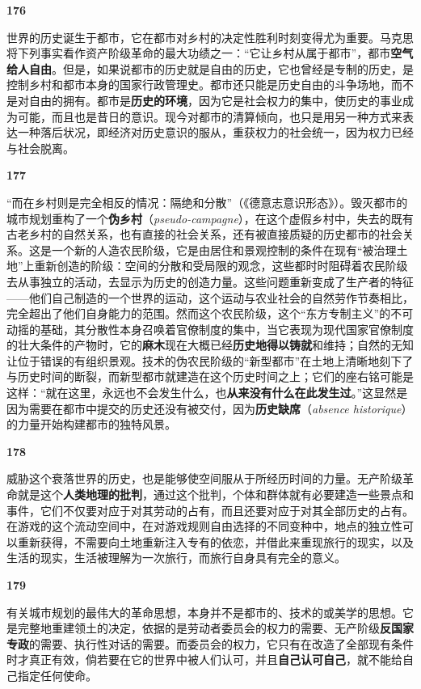 \documentclass[fontset=fandol, a4paper, 12pt, openright]{ctexbook}
\makeatletter
\newcommand{\thesis}[1]{%
    \par\vspace{1.5em}%
    {\centering \textbf{\Large #1}\par}%
    \nobreak\vspace{0.5em}\nobreak
    \@afterindenttrue %
    \@afterheading    %
}
\makeatother
\begin{document}
\thesis{176}
世界的历史诞生于都市，它在都市对乡村的决定性胜利时刻变得尤为重要。马克思将下列事实看作资产阶级革命的最大功绩之一：“它让乡村从属于都市”，都市\textbf{空气给人自由}。但是，如果说都市的历史就是自由的历史，它也曾经是专制的历史，是控制乡村和都市本身的国家行政管理史。都市还只能是历史自由的斗争场地，而不是对自由的拥有。都市是\textbf{历史的环境}，因为它是社会权力的集中，使历史的事业成为可能，而且也是昔日的意识。现今对都市的清算倾向，也只是用另一种方式来表达一种落后状况，即经济对历史意识的服从，重获权力的社会统一，因为权力已经与社会脱离。

\thesis{177}
“而在乡村则是完全相反的情况：隔绝和分散”（《德意志意识形态》）。毁灭都市的城市规划重构了一个\textbf{伪乡村}（\textit{pseudo-campagne}），在这个虚假乡村中，失去的既有古老乡村的自然关系，也有直接的社会关系，还有被直接质疑的历史都市的社会关系。这是一个新的人造农民阶级，它是由居住和景观控制的条件在现有“被治理土地”上重新创造的阶级：空间的分散和受局限的观念，这些都时时阻碍着农民阶级去从事独立的活动，去显示为历史的创造力量。这些问题重新变成了生产者的特征——他们自己制造的一个世界的运动，这个运动与农业社会的自然劳作节奏相比，完全超出了他们自身能力的范围。然而这个农民阶级，这个“东方专制主义”的不可动摇的基础，其分散性本身召唤着官僚制度的集中，当它表现为现代国家官僚制度的壮大条件的产物时，它的\textbf{麻木}现在大概已经\textbf{历史地得以铸就}和维持；自然的无知让位于错误的有组织景观。技术的伪农民阶级的“新型都市”在土地上清晰地刻下了与历史时间的断裂，而新型都市就建造在这个历史时间之上；它们的座右铭可能是这样：“就在这里，永远也不会发生什么，也\textbf{从来没有什么在此发生过}。”这显然是因为需要在都市中提交的历史还没有被交付，因为\textbf{历史缺席}（\textit{absence historique}）的力量开始构建都市的独特风景。

\thesis{178}
威胁这个衰落世界的历史，也是能够使空间服从于所经历时间的力量。无产阶级革命就是这个\textbf{人类地理的批判}，通过这个批判，个体和群体就有必要建造一些景点和事件，它们不仅要对应于对其劳动的占有，而且还要对应于对其全部历史的占有。在游戏的这个流动空间中，在对游戏规则自由选择的不同变种中，地点的独立性可以重新获得，不需要向土地重新注入专有的依恋，并借此来重现旅行的现实，以及生活的现实，生活被理解为一次旅行，而旅行自身具有完全的意义。

\thesis{179}
有关城市规划的最伟大的革命思想，本身并不是都市的、技术的或美学的思想。它是完整地重建领土的决定，依据的是劳动者委员会的权力的需要、无产阶级\textbf{反国家专政}的需要、执行性对话的需要。而委员会的权力，它只有在改造了全部现有条件时才真正有效，倘若要在它的世界中被人们认可，并且\textbf{自己认可自己}，就不能给自己指定任何使命。
\end{document}
